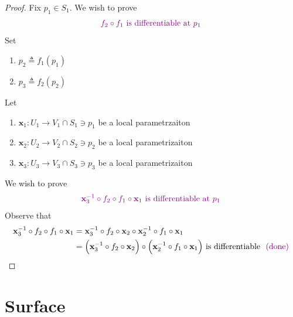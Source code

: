 \documentclass{report}
\begin{document}
\begin{proof}
Fix $p_1\in S_1 $. We wish to prove 
\begin{align*}
  \textcolor{violet}{f_2\circ f_1\text{ is differentiable at $p_1$ }}
\end{align*}
Set 
\begin{enumerate}[label=(\alph*)]
  \item $p_2\triangleq f_1(p_1)$ 
  \item $p_3\triangleq f_2(p_2)$
\end{enumerate}
Let 
\begin{enumerate}[label=(\alph*)]
  \item $\textbf{x}_1:U_1 \rightarrow V_1\cap S_1 \ni p_1 $ be a local parametrzaiton 
   \item $\textbf{x}_2:U_2\rightarrow V_2\cap S_2\ni p_2$ be a local parametrizaiton 
    \item $\textbf{x}_3:U_3\rightarrow V_3\cap S_3\ni p_3$ be a local parametrizaiton 
\end{enumerate}
We wish to prove 
\begin{align*}
  \textcolor{violet}{\textbf{x}_3^{-1}\circ f_2\circ f_1 \circ \textbf{x}_1\text{ is differentiable at $p_1$ }}
\end{align*}
Observe that 
\begin{align*}
\textbf{x}_3^{-1}\circ f_2\circ f_1\circ \textbf{x}_1&=\textbf{x}_3^{-1}\circ f_2 \circ \textbf{x}_2 \circ \textbf{x}_2^{-1} \circ f_1 \circ \textbf{x}_1\\
&=\Big(\textbf{x}_3^{-1}\circ f_2\circ \textbf{x}_2 \Big)\circ \Big(\textbf{x}_2^{-1}\circ f_1\circ \textbf{x}_1 \Big)\text{ is differentiable $\textcolor{violet}{\text{ (done) }}$}
\end{align*}
\end{proof}


\chapter{Surface}
\end{document}
